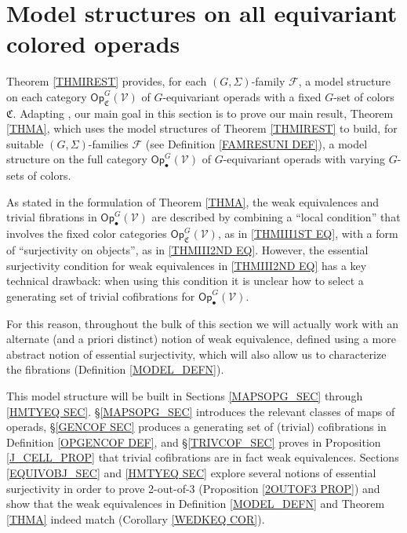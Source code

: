 \documentclass[a4paper,10pt
 ,final
]{article}%
\numberwithin{equation}{section}
\numberwithin{figure}{section}
\theoremstyle{definition} %
\newcommand{\F}{\ensuremath{\mathcal F}}
\newcommand{\V}{\ensuremath{\mathcal V}}
\newcommand{\C}{\ensuremath{\mathcal C}}
\newcommand{\1}{\ensuremath{\mathbbm 1}}%
\begin{document}
\section{Model structures on all equivariant colored operads}
\label{MS_SEC}


\renewcommand{\C}{\mathfrak C}


Theorem \ref{THMIREST} provides,
for each $(G,\Sigma)$-family $\F$,
a model structure on each category
$\mathsf{Op}_{\mathfrak{C}}^G(\V)$
of $G$-equivariant operads with a fixed $G$-set of colors $\mathfrak{C}$.
Adapting \cite{BM13,Cav,CM13b},
our main goal in this section is 
to prove our main result, Theorem \ref{THMA},
which uses the model structures of Theorem \ref{THMIREST}
to build,
for suitable $(G,\Sigma)$-families $\F$ 
(see Definition \ref{FAMRESUNI DEF}),
a model structure on the full category $\mathsf{Op}^G_\bullet(\mathcal{V})$
of $G$-equivariant operads with varying $G$-sets of colors. 


As stated in the formulation of Theorem \ref{THMA},
the weak equivalences and trivial fibrations 
in $\mathsf{Op}^G_\bullet(\V)$
are described by combining
a ``local condition'' that involves the fixed color categories $\mathsf{Op}_{\mathfrak{C}}^G(\V)$,
as in \eqref{THMIII1ST EQ},
with a form of ``surjectivity on objects'',
as in \eqref{THMIII2ND EQ}.
However, the essential surjectivity condition for 
weak equivalences in \eqref{THMIII2ND EQ}
has a key technical drawback: 
when using this condition 
it is unclear how to select a generating set of trivial cofibrations 
for $\mathsf{Op}^G_\bullet(\V)$.

For this reason, 
throughout the bulk of this section we will actually work with 
an alternate (and a priori distinct)
notion of weak equivalence,
defined using a more abstract notion of essential surjectivity,
which will also allow us to characterize the fibrations (Definition \ref{MODEL_DEFN}).


This model structure will be built in Sections \ref{MAPSOPG_SEC} through \ref{HMTYEQ SEC}.
\S \ref{MAPSOPG_SEC} introduces the relevant classes of maps of operads,
\S \ref{GENCOF SEC} produces a generating set of (trivial) cofibrations in Definition \ref{OPGENCOF DEF},
and \S \ref{TRIVCOF_SEC} proves in Proposition \ref{J_CELL_PROP} that trivial cofibrations are in fact weak equivalences.
Sections \ref{EQUIVOBJ_SEC} and \ref{HMTYEQ SEC} explore several notions of essential surjectivity in order to prove 2-out-of-3
(Proposition \ref{2OUTOF3 PROP})
and show that the weak equivalences in Definition \ref{MODEL_DEFN}
and Theorem \ref{THMA} indeed match
(Corollary \ref{WEDKEQ COR}).
\end{document}
